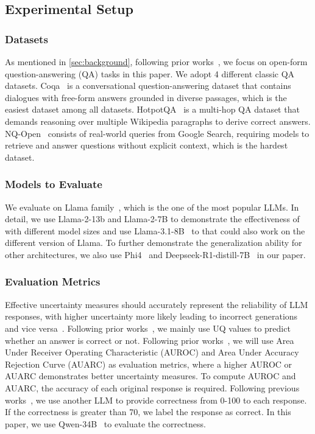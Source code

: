 \subsection{Experimental Setup}
\label{sec:setup}
\subsubsection{Datasets} As mentioned in \cref{sec:background}, following prior works~\cite{lin2022teaching}, we focus on open-form question-answering 
(QA) tasks in this paper. We adopt 4 different classic QA datasets. Coqa~\cite{reddy2019coqa} is a conversational question-answering dataset that contains dialogues with free-form answers grounded in diverse passages, which is the easiest dataset among all datasets. HotpotQA~\cite{yang2018hotpotqa} is a multi-hop QA dataset that demands reasoning over multiple Wikipedia paragraphs to derive correct answers. NQ-Open~\cite{kwiatkowski2019natural} consists of real-world queries from Google Search, requiring models to retrieve and answer questions without explicit context, which is the hardest dataset. 
\subsubsection{Models to Evaluate} We evaluate \ours on Llama family~\cite{touvron2023llama}, which is the one of the most popular LLMs. In detail, we use Llama-2-13b and Llama-2-7B to demonstrate the effectiveness of \ours with different model sizes and use Llama-3.1-8B~\cite{dubey2024llama} to that \ours could also work on the different version of Llama. To further demonstrate the generalization ability for other architectures,  we also use Phi4~\cite{abdin2024phi} and Deepseek-R1-distill-7B~\cite{guo2025deepseek} in our paper.



\subsubsection{Evaluation Metrics} Effective uncertainty measures should accurately represent the reliability of LLM responses, with higher uncertainty more likely leading to incorrect generations and vice versa~\cite{lin2023generating,kuhn2023semantic}. Following prior works~\cite{lin2023generating,da2024llm}, we mainly use UQ values to predict whether an answer is correct or not. Following prior works~\cite{lin2023generating,da2024llm}, we will use Area Under Receiver Operating Characteristic (AUROC) and Area Under Accuracy Rejection Curve (AUARC) as evaluation metrics, where a higher AUROC or AUARC demonstrates better uncertainty measures. To compute AUROC and AUARC, the accuracy of each original response is required. Following previous works~\cite{da2024llm,lin2023generating}, we use another LLM to provide correctness from 0-100 to each response. If the correctness is greater than 70, we label the response as correct. In this paper, we use Qwen-34B~\cite{bai2023qwen} to evaluate the correctness.

